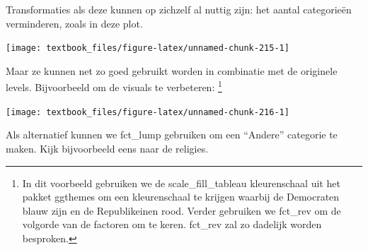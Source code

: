 \documentclass[]{tufte-book}
\newenvironment{Shaded}{}{}
\newcommand{\DataTypeTok}[1]{\textcolor[rgb]{0.56,0.13,0.00}{#1}}
\newcommand{\KeywordTok}[1]{\textcolor[rgb]{0.00,0.44,0.13}{\textbf{#1}}}
\newcommand{\NormalTok}[1]{#1}
\newcommand{\OperatorTok}[1]{\textcolor[rgb]{0.40,0.40,0.40}{#1}}
\newcommand{\StringTok}[1]{\textcolor[rgb]{0.25,0.44,0.63}{#1}}
\begin{document}
Transformaties als deze kunnen op zichzelf al nuttig zijn: het aantal categorieën verminderen, zoals in deze plot.

\begin{Shaded}
\end{Shaded}

\texttt{[image: textbook\_files/figure-latex/unnamed-chunk-215-1]}

Maar ze kunnen net zo goed gebruikt worden in combinatie met de originele levels. Bijvoorbeeld om de visuals te verbeteren: \footnote{In dit voorbeeld gebruiken we de scale\_fill\_tableau kleurenschaal uit het pakket ggthemes om een kleurenschaal te krijgen waarbij de Democraten blauw zijn en de Republikeinen rood. Verder gebruiken we fct\_rev om de volgorde van de factoren om te keren. fct\_rev zal zo dadelijk worden besproken.}

\begin{Shaded}
\end{Shaded}

\texttt{[image: textbook\_files/figure-latex/unnamed-chunk-216-1]}

Als alternatief kunnen we fct\_lump gebruiken om een ``Andere'' categorie te maken. Kijk bijvoorbeeld eens naar de religies.

\begin{Shaded}
\end{Shaded}
\end{document}
